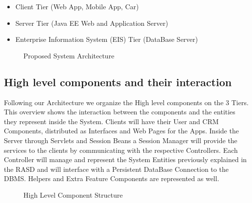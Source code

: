 \documentclass[a4paper]{article}
\begin{document}
\begin{itemize}
\item Client Tier (Web App, Mobile App, Car)
\item Server Tier (Java EE Web and Application Server)
\item Enterprise Information System (EIS) Tier (DataBase Server)
\end{itemize}

\begin{figure}[h]
\centering
\vspace*{\fill}
\noindent{}%
\caption {Proposed System Architecture}
\vspace*{0.5cm}
\end{figure}
\newpage

\subsection{High level components and their interaction}
Following our Architecture we organize the High level components on the 3 Tiers. This overview shows the interaction between the components and the entities they represent inside the System. Clients will have their User and CRM Components, distributed as Interfaces and Web Pages for the Apps. Inside the Server through Servlets and Session Beans a Session Manager will provide the services to the clients by communicating with the respective Controllers. Each Controller will manage and represent the System Entities previously explained in the RASD and will interface with a Persistent DataBase Connection to the DBMS. Helpers and Extra Feature Components are represented as well.

\begin{figure}[h]
\centering
\vspace*{\fill}
\noindent{}%
\caption {High Level Component Structure}
\vspace*{0.5cm}
\end{figure}
\end{document}

